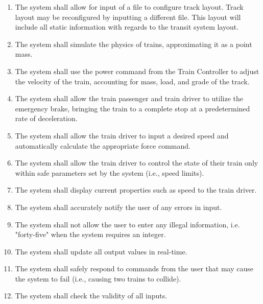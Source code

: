 \documentclass{article}
\begin{document}
\begin{enumerate}
        \item The system shall allow for input of a file to configure track layout. Track layout may be reconfigured by inputting a different file. This layout will include all static information with regards to the transit system layout. 
        
        \item The system shall simulate the physics of trains, approximating it as a point mass.
        \item The system shall use the power command from the Train Controller  to adjust the velocity of the train, accounting for mass, load, and grade of the track.
        \item The system shall allow the train passenger and train driver to utilize the emergency brake, bringing the train to a complete stop at a predetermined rate of deceleration. 
        
        \item The system shall allow the train driver to input a desired speed and automatically calculate the appropriate force command.
        \item The system shall allow the train driver to control the state of their train only within safe parameters set by the system (i.e., speed limits). 
        \item The system shall display current properties such as speed to the train driver.
        
        \item The system shall accurately notify the user of any errors in input.
        \item The system shall not allow the user to enter any illegal information, i.e. "forty-five" when the system requires an integer.
        \item The system shall update all output values in real-time. 
        \item The system shall safely respond to commands from the user that may cause the system to fail (i.e., causing two trains to collide).
        \item The system shall check the validity of all inputs.
    \end{enumerate}
\end{document}
